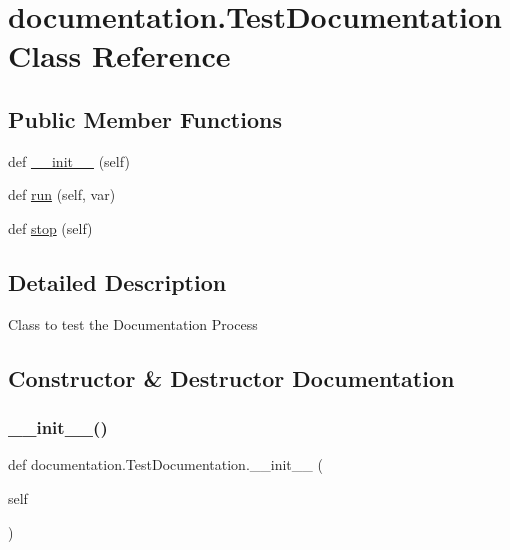 \hypertarget{classdocumentation_1_1_test_documentation}{}\section{documentation.\+Test\+Documentation Class Reference}
\label{classdocumentation_1_1_test_documentation}
\subsection*{Public Member Functions}
\begin{DoxyCompactItemize}
\item 
def \mbox{\hyperlink{classdocumentation_1_1_test_documentation_ac1d5e8ee566a298a5f6aeca666b52ac4}{\+\_\+\+\_\+init\+\_\+\+\_\+}} (self)
\item 
def \mbox{\hyperlink{classdocumentation_1_1_test_documentation_ac16dcfbf318521a5b7d41c170a452004}{run}} (self, var)
\item 
def \mbox{\hyperlink{classdocumentation_1_1_test_documentation_a2a1879fb99eedfa7347e5ae67c655bbf}{stop}} (self)
\end{DoxyCompactItemize}


\subsection{Detailed Description}
\begin{DoxyVerb}Class to test the Documentation Process
\end{DoxyVerb}
 

\subsection{Constructor \& Destructor Documentation}
\mbox{\label{classdocumentation_1_1_test_documentation_ac1d5e8ee566a298a5f6aeca666b52ac4}} 
\subsubsection{\texorpdfstring{\_\_init\_\_()}{\_\_init\_\_()}}
{\footnotesize\ttfamily def documentation.\+Test\+Documentation.\+\_\+\+\_\+init\+\_\+\+\_\+ (\begin{DoxyParamCaption}\item[{}]{self }\end{DoxyParamCaption})}

